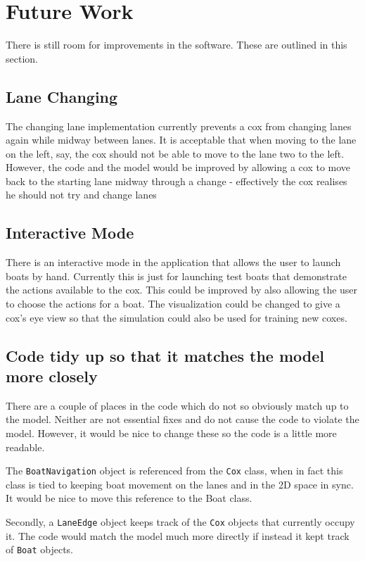 {\section{Future Work}
There is still room for improvements in the software. These are outlined in this section.

\subsection{Lane Changing}
The changing lane implementation currently prevents a cox from changing lanes again while midway between lanes. It is acceptable that when moving to the lane on the left, say, the cox should not be able to move to the lane two to the left. However, the code and the model would be improved by allowing a cox to move back to the starting lane midway through a change - effectively the cox realises he should not try and change lanes

\subsection{Interactive Mode}
There is an interactive mode in the application that allows the user to launch boats by hand. Currently this is just for launching test boats that demonstrate the actions available to the cox. This could be improved by also allowing the user to choose the actions for a boat. The visualization could be changed to give a cox's eye view so that the simulation could also be used for training new coxes.

\subsection{Code tidy up so that it matches the model more closely}
There are a couple of places in the code which do not so obviously match up to the model. Neither are not essential fixes and do not cause the code to violate the model. However, it would be nice to change these so the code is a little more readable. 

The \texttt{BoatNavigation} object is referenced from the \texttt{Cox} class, when in fact this class is tied to keeping boat movement on the lanes and in the 2D space in sync. It would be nice to move this reference to the Boat class.

Secondly, a \texttt{LaneEdge} object keeps track of the \texttt{Cox} objects that currently occupy it. The code would match the model much more directly if instead it kept track of \texttt{Boat} objects.

}

